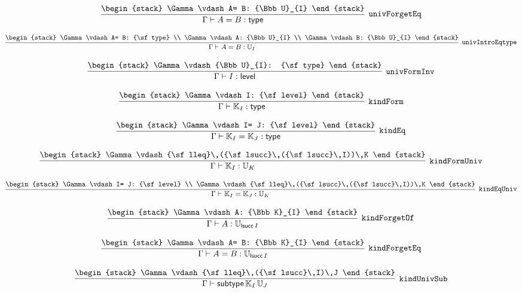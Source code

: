 \[
\infer[{\tt univForgetEq}]{\Gamma \vdash A= B: {\sf type}}{
\begin{stack}
\Gamma \vdash A= B: {\Bbb U}_{I}
\end{stack}}
\]

\[
\infer[{\tt univIntroEqtype}]{\Gamma \vdash A= B: {\Bbb U}_{I}}{
\begin{stack}
\Gamma \vdash A= B: {\sf type}
\\
\Gamma \vdash A: {\Bbb U}_{I}
\\
\Gamma \vdash B: {\Bbb U}_{I}
\end{stack}}
\]

\[
\infer[{\tt univFormInv}]{\Gamma \vdash I: {\sf level}}{
\begin{stack}
\Gamma \vdash {\Bbb U}_{I}: {\sf type}
\end{stack}}
\]

\[
\infer[{\tt kindForm}]{\Gamma \vdash {\Bbb K}_{I}: {\sf type}}{
\begin{stack}
\Gamma \vdash I: {\sf level}
\end{stack}}
\]

\[
\infer[{\tt kindEq}]{\Gamma \vdash {\Bbb K}_{I}= {\Bbb K}_{J}: {\sf type}}{
\begin{stack}
\Gamma \vdash I= J: {\sf level}
\end{stack}}
\]

\[
\infer[{\tt kindFormUniv}]{\Gamma \vdash {\Bbb K}_{I}: {\Bbb U}_{K}}{
\begin{stack}
\Gamma \vdash {\sf lleq}\,({\sf lsucc}\,({\sf lsucc}\,I))\,K
\end{stack}}
\]

\[
\infer[{\tt kindEqUniv}]{\Gamma \vdash {\Bbb K}_{I}= {\Bbb K}_{J}: {\Bbb U}_{K}}{
\begin{stack}
\Gamma \vdash I= J: {\sf level}
\\
\Gamma \vdash {\sf lleq}\,({\sf lsucc}\,({\sf lsucc}\,I))\,K
\end{stack}}
\]

\[
\infer[{\tt kindForgetOf}]{\Gamma \vdash A: {\Bbb U}_{{\sf lsucc}\,I}}{
\begin{stack}
\Gamma \vdash A: {\Bbb K}_{I}
\end{stack}}
\]

\[
\infer[{\tt kindForgetEq}]{\Gamma \vdash A= B: {\Bbb U}_{{\sf lsucc}\,I}}{
\begin{stack}
\Gamma \vdash A= B: {\Bbb K}_{I}
\end{stack}}
\]

\[
\infer[{\tt kindUnivSub}]{\Gamma \vdash {\sf subtype}\,{\Bbb K}_{I}\,{\Bbb U}_{J}}{
\begin{stack}
\Gamma \vdash {\sf lleq}\,({\sf lsucc}\,I)\,J
\end{stack}}
\]

